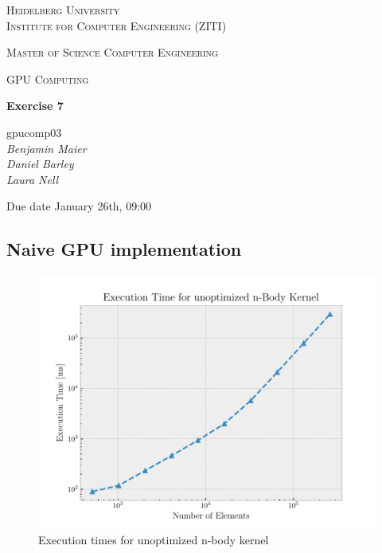 \documentclass[12pt]{article}
\newcommand{\lecture}{GPU Computing}
\newcommand{\exercise}{Exercise 7}
\newcommand{\groupnumber}{gpucomp03}
\newcommand{\groupmemberslist}{Benjamin Maier\\Daniel Barley\\Laura Nell}
\newcommand{\duedate}{January 26th, 09:00}
\begin{document}
	\begin{titlepage}
		\centering

		{\scshape\LARGE Heidelberg University\\Institute for Computer Engineering (ZITI) \par}
		\vspace{1.5cm}
		{\scshape\Large Master of Science Computer Engineering \par}
		\vspace{0.5cm}
		{\scshape\Large \lecture \par}
		\vspace{1.5cm}
		{\huge\bfseries \exercise \par}
		\vspace{2cm}
		{\Large \groupnumber \itshape \\ \vspace{30pt} \groupmemberslist \par}
		\vfill
		
		
		{\large Due date \duedate \par}
	\end{titlepage}

\setcounter{section}{7}

\subsection{Naive GPU implementation}
\begin{figure}[htpb]
	\centering
	\includegraphics[width=0.8\linewidth]{./plot/time_vs_elems_unopt.pdf}
	\caption{Execution times for unoptimized n-body kernel}%
	\label{fig:time_vs_elems_unopt}
\end{figure}
\end{document}
